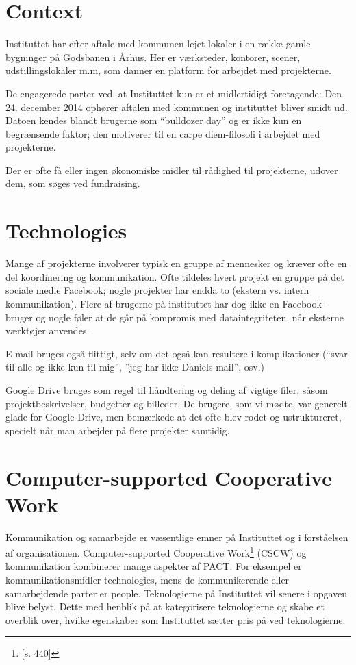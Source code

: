 \section{Context}
Instituttet har efter aftale med kommunen lejet lokaler i en række gamle bygninger på Godsbanen i Århus. Her er værksteder, kontorer, scener, udstillingslokaler m.m, som danner en platform for arbejdet med projekterne.

De engagerede parter ved, at Instituttet kun er et midlertidigt foretagende: Den
24. december 2014 ophører aftalen med kommunen og instituttet bliver smidt ud. Datoen kendes blandt brugerne som “bulldozer day” og er ikke kun en begrænsende faktor; den motiverer til en carpe diem-filosofi i arbejdet med projekterne.

Der er ofte få eller ingen økonomiske midler til rådighed til projekterne, udover dem, som søges ved fundraising.

\section{Technologies}
Mange af projekterne involverer typisk en gruppe af mennesker og kræver ofte en del koordinering og kommunikation. Ofte tildeles hvert projekt en gruppe på det sociale medie Facebook; nogle projekter har endda to (ekstern vs. intern kommunikation). Flere af brugerne på instituttet har dog ikke en Facebook-bruger og nogle føler at de går på kompromis med dataintegriteten, når eksterne værktøjer anvendes.

E-mail bruges også flittigt, selv om det også kan resultere i komplikationer (“svar til alle og ikke kun til mig”, ”jeg har ikke Daniels mail”, osv.)

Google Drive bruges som regel til håndtering og deling af vigtige filer, såsom projektbeskrivelser, budgetter og billeder. De brugere, som vi mødte, var generelt glade for Google Drive, men bemærkede at det ofte blev rodet og ustruktureret, specielt når man arbejder på flere projekter samtidig.

\section{Computer-supported Cooperative Work}
Kommunikation og samarbejde er væsentlige emner på Instituttet og i forståelsen af organisationen. Computer-supported Cooperative Work\footnote{\citep{Benyon}[s. 440]} (CSCW) og kommunikation kombinerer mange aspekter af PACT. For eksempel er kommunikationsmidler technologies, mens de kommunikerende eller samarbejdende parter er people. Teknologierne på Instituttet vil senere i opgaven blive belyst. Dette med henblik på at kategorisere teknologierne og skabe et overblik over, hvilke egenskaber som Instituttet sætter pris på ved teknologierne.
 
